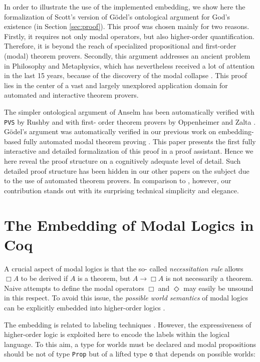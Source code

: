 \documentclass{llncs}
\newcommand{\imp}{\rightarrow}
\begin{document}
In order to illustrate the use of the implemented embedding, we show
here the formalization of Scott's version \cite{ScottNotes} of Gödel's
ontological argument for God's existence (in Section \ref{sec:proof}).
This proof was chosen mainly for two reasons. Firstly, it requires not
only modal operators, but also higher-order quantification. Therefore,
it is beyond the reach of specialized propositional and first-order
(modal) theorem provers. Secondly, this argument addresses an ancient
problem in Philosophy and Metaphysics, which has nevertheless received
a lot of attention in the last 15 years, because of the discovery of
the modal collapse \cite{ToDo}. This proof lies in the center of a
vast and largely unexplored application domain for automated and
interactive theorem provers.

The simpler ontological argument of Anselm has been automatically
verified with \texttt{PVS} by Rushby \cite{Rushby} and with first-
order theorem provers by Oppenheimer and Zalta \cite{Zalta}. Gödel's
argument was automatically verified in our previous work on embedding-
based fully automated modal theorem proving \cite{arXiv,AFP}. This
paper presents the first fully interactive and detailed formalization
of this proof in a proof assistant. Hence we here reveal the proof
structure on a cognitively adequate level of
detail. Such detailed proof structure has been hidden in our
other papers on the subject due to the use of automated theorem
provers. In comparison to \cite{Rushby,Zalta}, however, our
contribution stands out with its surprising technical 
simplicity and elegance. 


\section{The Embedding of Modal Logics in Coq}
\label{sec:Embedding}

A crucial aspect of modal logics \cite{ModalLogic} is that the so-
called \emph{necessitation rule} allows $\Box A$ to be derived if $A$
is a theorem, but $A \imp \Box A$ is not necessarily a theorem. Naive
attempts to define the modal operators $\Box$ and $\Diamond$ may
easily be unsound in this respect. To avoid this issue, the
\emph{possible world semantics} of modal logics can be explicitly
embedded into higher-order logics \cite{J23,B9}.

The embedding is related to labeling techniques \cite{Labels}.
However, the expressiveness of higher-order logic is exploited here to
encode the labels within the logical language. To this aim, a type for
worlds must be declared and modal propositions should be not of type
\texttt{Prop} but of a lifted type \texttt{o} that depends on possible
worlds:
\end{document}
